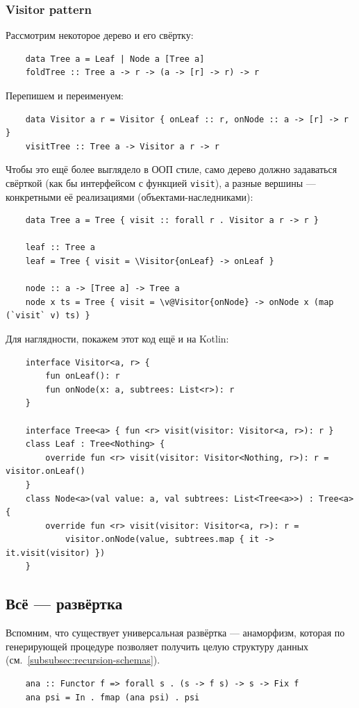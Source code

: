 \subsubsection{Visitor pattern} \label{subsubsec:visitor}

Рассмотрим некоторое дерево и его свёртку:
\begin{verbatim}
    data Tree a = Leaf | Node a [Tree a]
    foldTree :: Tree a -> r -> (a -> [r] -> r) -> r
\end{verbatim}

Перепишем и переименуем:
\begin{verbatim}
    data Visitor a r = Visitor { onLeaf :: r, onNode :: a -> [r] -> r }
    visitTree :: Tree a -> Visitor a r -> r
\end{verbatim}

Чтобы это ещё более выглядело в ООП стиле, само дерево должно задаваться свёрткой (как бы интерфейсом с функцией \texttt{visit}), а разные вершины --- конкретными её реализациями (объектами-наследниками):
\begin{verbatim}
    data Tree a = Tree { visit :: forall r . Visitor a r -> r }

    leaf :: Tree a
    leaf = Tree { visit = \Visitor{onLeaf} -> onLeaf }

    node :: a -> [Tree a] -> Tree a
    node x ts = Tree { visit = \v@Visitor{onNode} -> onNode x (map (`visit` v) ts) }
\end{verbatim}

Для наглядности, покажем этот код ещё и на Kotlin:
\begin{verbatim}
    interface Visitor<a, r> {
        fun onLeaf(): r
        fun onNode(x: a, subtrees: List<r>): r
    }

    interface Tree<a> { fun <r> visit(visitor: Visitor<a, r>): r }
    class Leaf : Tree<Nothing> {
        override fun <r> visit(visitor: Visitor<Nothing, r>): r = visitor.onLeaf()
    }
    class Node<a>(val value: a, val subtrees: List<Tree<a>>) : Tree<a> {
        override fun <r> visit(visitor: Visitor<a, r>): r =
            visitor.onNode(value, subtrees.map { it -> it.visit(visitor) })
    }
\end{verbatim}

\subsection{Всё --- развёртка} \label{subsec:all-unfolds}

Вспомним, что существует универсальная развёртка --- анаморфизм, которая по генерирующей процедуре позволяет получить целую структуру данных (см.~\ref{subsubsec:recursion-schemas}).
\begin{verbatim}
    ana :: Functor f => forall s . (s -> f s) -> s -> Fix f
    ana psi = In . fmap (ana psi) . psi
\end{verbatim}

